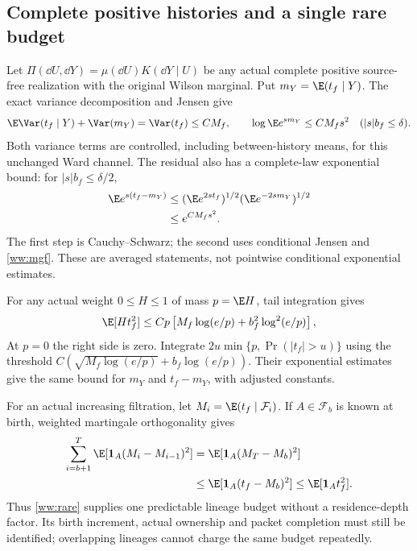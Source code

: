 \subsection{Complete positive histories and a single rare budget}

Let
$\Pi(\dd U,\dd Y)=\mu(\dd U)K(\dd Y\mid U)$ be any actual complete positive source-free realization with the original Wilson marginal. Put $m_Y=\E(t_f\mid Y)$. The exact variance decomposition and Jensen give
\begin{equation}
 \E\Var(t_f\mid Y)+\Var(m_Y)=\Var(t_f)\le CM_f,
 \qquad
 \log\E e^{s m_Y}\le CM_fs^2
 \quad (|s|b_f\le\delta).
 \label{ww:history}
\end{equation}
Both variance terms are controlled, including between-history means, for this unchanged Ward channel. The residual also has a complete-law exponential bound: for $|s|b_f\le\delta/2$,
\begin{align}
 \E e^{s(t_f-m_Y)}
 &\le
   (\E e^{2st_f})^{1/2}(\E e^{-2s m_Y})^{1/2}\notag\\
 &\le e^{CM_fs^2}.
 \label{ww:historyresidual}
\end{align}
The first step is Cauchy--Schwarz; the second uses conditional Jensen and \eqref{ww:mgf}. These are averaged statements, not pointwise conditional exponential estimates.

For any actual weight $0\le H\le1$ of mass $p=\E H$, tail integration gives
\begin{equation}
 \E[H t_f^2]\le
 Cp\left[M_f\log(e/p)+b_f^2\log^2(e/p)\right],
 \label{ww:rare}
\end{equation}
At $p=0$ the right side is zero. Integrate
$2u\min\{p,\Pr(|t_f|>u)\}$ using the threshold
$C(\sqrt{M_f\log(e/p)}+b_f\log(e/p))$.
Their exponential estimates give the same bound for $m_Y$ and $t_f-m_Y$, with adjusted constants.

For an actual increasing filtration, let $M_i=\E(t_f\mid\mathcal F_i)$.
If $A\in\mathcal F_b$ is known at birth, weighted martingale orthogonality gives
\begin{align}
 \sum_{i=b+1}^{T}\E[\mathbf1_A(M_i-M_{i-1})^2]
 &=\E[\mathbf1_A(M_T-M_b)^2]\notag\\
 &\le\E[\mathbf1_A(t_f-M_b)^2]
 \le\E[\mathbf1_A t_f^2].
 \label{ww:lineage}
\end{align}
Thus \eqref{ww:rare} supplies one predictable lineage budget without a residence-depth factor. Its birth increment, actual ownership and packet completion must still be identified; overlapping lineages cannot charge the same budget repeatedly.


